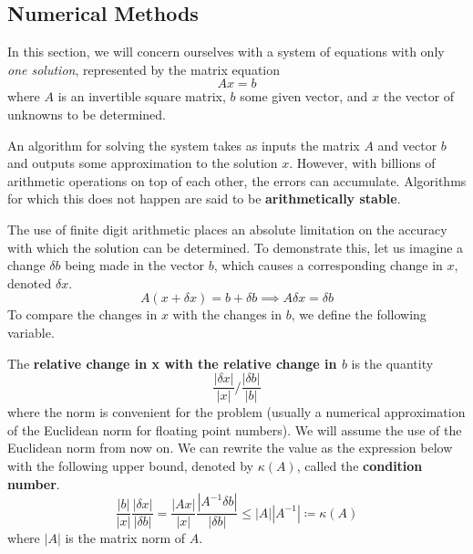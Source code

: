 \subsection{Numerical Methods}

  In this section, we will concern ourselves with a system of equations with only \textit{one solution}, represented by the matrix equation
  \begin{equation}
    A x = b
  \end{equation}
  where $A$ is an invertible square matrix, $b$ some given vector, and $x$ the vector of unknowns to be determined. 

  An algorithm for solving the system takes as inputs the matrix $A$ and vector $b$ and outputs some approximation to the solution $x$. However, with billions of arithmetic operations on top of each other, the errors can accumulate. Algorithms for which this does not happen are said to be \textbf{arithmetically stable}. 

  The use of finite digit arithmetic places an absolute limitation on the accuracy with which the solution can be determined. To demonstrate this, let us imagine a change $\delta b$ being made in the vector $b$, which causes a corresponding change in $x$, denoted $\delta x$. 
  \begin{equation}
    A(x + \delta x) = b + \delta b \implies A \delta x = \delta b
  \end{equation}
  To compare the changes in $x$ with the changes in $b$, we define the following variable. 

  \begin{definition}
    \label{def:relative-change-in-x-against-relative-change-in}
    The \textbf{relative change in x with the relative change in $b$} is the quantity
    \begin{equation}
      \frac{|\delta x|}{|x|} \bigg/ \frac{|\delta b|}{|b|}
    \end{equation}
    where the norm is convenient for the problem (usually a numerical approximation of the Euclidean norm for floating point numbers). We will assume the use of the Euclidean norm from now on. We can rewrite the value as the expression below with the following upper bound, denoted by $\kappa (A)$, called the \textbf{condition number}. 
    \begin{equation}
      \frac{|b|}{|x|} \frac{|\delta x|}{|\delta b|} = \frac{|Ax|}{|x|} \frac{|A^{-1} \delta b|}{|\delta b|} \leq |A||A^{-1}| \coloneqq \kappa (A)
    \end{equation}
    where $|A|$ is the matrix norm of $A$. 
  \end{definition}

